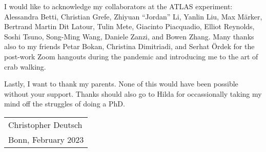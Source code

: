 I would like to acknowledge my collaborators at the ATLAS experiment: Alessandra
Betti, Christian Grefe, Zhiyuan ``Jordan'' Li, Yanlin Liu, Max Märker, Bertrand
Martin Dit Latour, Tulin Mete, Giacinto Piacquadio, Elliot Reynolds, Soshi
Tsuno, Song-Ming Wang, Daniele Zanzi, and Bowen Zhang. Many thanks also to my
\bbtautau friends Petar Bokan, Christina Dimitriadi, and Serhat Ördek for the
post-work Zoom hangouts during the pandemic and introducing me to the art of
crab walking.

Lastly, I want to thank my parents. None of this would have been possible
without your support. Thanks should also go to Hilda for occassionally taking my
mind off the struggles of doing a PhD.

\vspace*{4\baselineskip}

\hfill%
\begin{tabular}{l}
  Christopher Deutsch \\
  Bonn, February 2023
\end{tabular}

